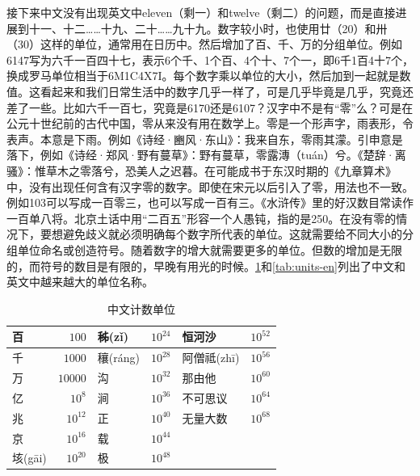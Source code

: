 \documentclass[b5paper]{ctexart}
\begin{document}
接下来中文没有出现英文中eleven（剩一）和twelve（剩二）的问题，而是直接进展到十一、十二……十九、二十……九十九。数字较小时，也使用廿（20）和卅（30）这样的单位，通常用在日历中。然后增加了百、千、万的分组单位。例如6147写为六千一百四十七，表示6个千、1个百、4个十、7个一，即6千1百4十7个，换成罗马单位相当于6M1C4X7I。每个数字乘以单位的大小，然后加到一起就是数值。这看起来和我们日常生活中的数字几乎一样了，可是几乎毕竟是几乎，究竟还差了一些。比如六千一百七，究竟是6170还是6107？汉字中不是有“零”么？可是在公元十世纪前的古代中国，零从来没有用在数学上。零是一个形声字，雨表形，令表声。本意是下雨。例如《诗经·豳风·东山》：我来自东，零雨其濛。引申意是落下，例如《诗经·郑风·野有蔓草》：野有蔓草，零露漙（tu\'{a}n）兮。《楚辞·离骚》：惟草木之零落兮，恐美人之迟暮。在可能成书于东汉时期的《九章算术》中，没有出现任何含有汉字零的数字。即使在宋元以后引入了零，用法也不一致。例如103可以写成一百零三，也可以写成一百有三。《水浒传》里的好汉数目常读作一百单八将。北京土话中用“二百五”形容一个人愚钝，指的是250。在没有零的情况下，要想避免歧义就必须明确每个数字所代表的单位。这就需要给不同大小的分组单位命名或创造符号。随着数字的增大就需要更多的单位。但数的增加是无限的，而符号的数目是有限的，早晚有用光的时候。\cref{tab:units-cn}和\cref{tab:units-en}列出了中文和英文中越来越大的单位名称。

\begin{table}[htbp]
\centering
  \begin{tabular}{|l|r|l|r|l|r|}
  \hline
  百            & $100$      & 秭(z\v{i})    & $10^{24}$ &  恒河沙  & $10^{52}$ \\
  \hline
  千            & $1000$     & 穰(r\'{a}ng)  & $10^{28}$ & 阿僧祗(zh\={i})  & $10^{56}$ \\
  \hline
  万            & $10000$    & 沟            & $10^{32}$ & 那由他        & $10^{60}$  \\
  \hline
  亿            & $10^8$     & 涧            & $10^{36}$ &  不可思议      & $10^{64}$ \\
  \hline
  兆            & $10^{12}$  & 正            & $10^{40}$ &  无量大数      & $10^{68}$ \\
  \hline
  京            & $10^{16}$  & 载            & $10^{44}$ &               & \\
  \hline
  垓(g\={a}i)   & $10^{20}$  & 极            & $10^{48}$ &               & \\
  \hline
  \end{tabular}
  \caption{中文计数单位}
  \label{tab:units-cn}
\end{table}
\end{document}
